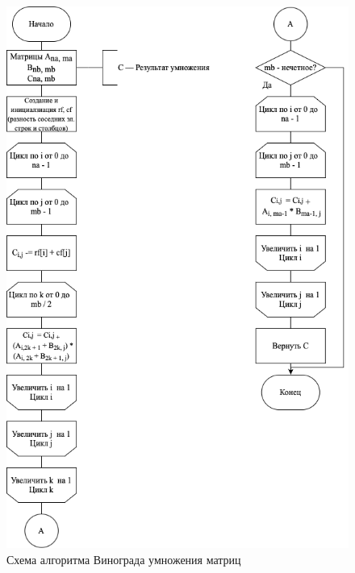 \begin{figure}
    \centering
    \includegraphics[scale=0.75]{vinograd.png}
    \caption{Схема алгоритма Винограда умножения матриц}
    \label{img:vinograd}
\end{figure}

